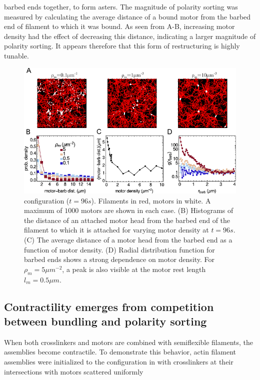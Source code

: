 \documentclass[12pt]{article} \usepackage{times} \usepackage{graphicx}
\begin{document}
barbed ends together, to form asters. The magnitude of polarity sorting was
measured by calculating the average distance of a bound motor from the barbed
end of filament to which it was bound. As seen from 
A-B, increasing motor density had the effect of decreasing this distance,
indicating a larger magnitude of polarity sorting. It appears therefore that
this form of restructuring is highly tunable.  \begin{figure}[H] \centering
  \includegraphics[scale=1.2] {figs/polarity_sorting/ps_fig.pdf} \caption{%
    \label{fig:polarity_sorting}%
    configuration ($t=96s$).  Filaments in red, motors in white. A maximum of
    $1000$ motors are shown in each case.  (B) Histograms of the distance of an
    attached motor head from the barbed end of the filament to which it is
    attached for varying motor density at $t=96s$.  (C) The average distance of
    a motor head from the barbed end as a function of motor density.  (D)
    Radial distribution function for barbed ends shows a strong dependence on
    motor density. For $\rho_m=5\mu m^{-2}$, a peak is also visible at the
    motor rest length $l_m=0.5\mu m$.  } \end{figure} \subsection{Contractility
  emerges from competition between bundling and polarity sorting} \par When
  both crosslinkers and motors are combined with semiflexible filaments, the
  assemblies become contractile.  To demonstrate this behavior, actin filament
  assemblies were initialized to the configuration in  with
  crosslinkers at their intersections with motors scattered uniformly
\end{document}
